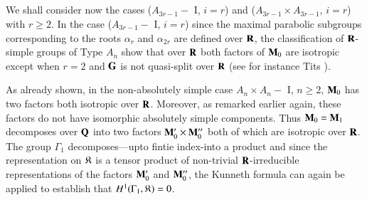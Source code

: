 \subsection{}\label{art9-subsec5.25}
We shall consider now the cases ($A_{3r-1} - $ I, $i=r$) and ($A_{3r-1} \times A_{3r-1}$, $i = r$) with $r \geqslant 2$. In the case ($A_{3r-1} -$ I, $i=r$) since the maximal parabolic subgroups corresponding to the roots $\alpha_r$  and $\alpha_{2r}$ are defined over $\mathbf{R}$, the classification of $\mathbf{R}$-simple groups of Type $A_n$ show that over $\mathbf{R}$ both factors of $\mathbf{M}_0$ are isotropic except when $r = 2$ and $\mathbf{G}$ is not quasi-split over $\mathbf{R}$ (see for instance Tits \cite{art9-tits-1}).

As already shown, in the non-absolutely simple case $A_n \times A_n - $ I, $n \geqslant 2$, $\mathbf{M}_0$ has two factors both isotropic over $\mathbf{R}$. Moreover, as remarked earlier again, these factors do not have isomorphic absolutely simple components. Thus $\mathbf{M}_0 = \mathbf{M}_1$ decomposes over $\mathbf{Q}$ into two factors $\mathbf{M}'_0 \times \mathbf{M}''_0$ both of which are isotropic over $\mathbf{R}$. The group $\Gamma_1$ decomposes---upto fintie index-into a product and since the representation on $\mathfrak{K}$ is a tensor product of non-trivial $\mathbf{R}$-irreducible representations of the factors $\mathbf{M}'_0$ and $\mathbf{M}''_0$, the Kunneth formula can again be applied to establish that $H^1 (\Gamma_1, \mathfrak{K}) =0$.

